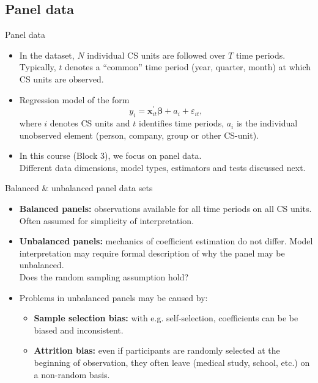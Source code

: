 \documentclass[usenames,dvipsnames]{beamer}
\begin{document}
\subsection*{Panel data}
\begin{frame}{Panel data}
\begin{itemize}
\item In the dataset, $N$ individual CS units are followed over $T$ time periods. Typically, $t$ denotes a ``common'' time period (year, quarter, month) at which CS units are observed.
\medskip
\item Regression model of the form $$y_i = \bm{x}_{it}^{\prime}\bm{\beta} + a_i + \varepsilon_{it},$$ where $i$ denotes CS units and $t$ identifies time periods, $a_i$ is the individual unobserved element  (person, company, group or other CS-unit). 
\medskip
\item In this course (Block 3), we focus on panel data.\\ \medskip Different data dimensions, model types, estimators and tests discussed next.
\end{itemize}
\end{frame}
\begin{frame}{Balanced \& unbalanced panel data sets}
\begin{itemize}
\bigskip
\item \textbf{Balanced panels:} observations available for all time periods on all CS units. Often assumed for simplicity of interpretation.
\bigskip
\item \textbf{Unbalanced panels:} mechanics of coefficient estimation do not differ. Model interpretation may require formal description of why the panel may be unbalanced.\\Does the random sampling assumption hold? 
\bigskip
\item Problems in unbalanced panels may be caused by: 
\medskip
\begin{itemize}
    \item \textbf{Sample selection bias:} with e.g. self-selection, coefficients can be be biased and inconsistent.
    \medskip
    \item \textbf{Attrition bias:} even if participants are randomly selected  at the beginning of observation, they often leave (medical study, school, etc.) on a non-random basis.   
\end{itemize}
\end{itemize}
\end{frame}
\end{document}

